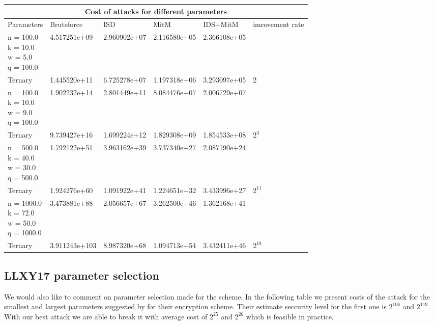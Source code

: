 \documentclass[12pt]{article}
\begin{document}
\begin{tabular}{ |l||p{}|p{}|p{}|p{}|p{2cm}|  }
 \hline
 \multicolumn{6}{|c|}{Cost of attacks for different parameters} \\
 \hline
 Parameters & Bruteforce & ISD & MitM & IDS+MitM & imrovement rate \\
 \hline
 \makecell{n = 100.0 \\ k = 10.0 \\ w = 5.0 \\ q = 100.0} & 4.517251e+09 & 2.960902e+07 & 2.116580e+05 & 2.366108e+05 & \\
 \hline
 Ternary & 1.445520e+11 & 6.725278e+07 & 1.197318e+06 & 3.293097e+05 & 2\\
 \hline
 \makecell{ n = 100.0 \\ k = 10.0 \\ w = 9.0 \\ q = 100.0} & 1.902232e+14 & 2.801449e+11 & 8.084476e+07 & 2.006729e+07 &  \\
 \hline
 Ternary & 9.739427e+16 & 1.699224e+12 & 1.829308e+09 & 1.854533e+08 & $2^{3}$ \\
 \hline
 \makecell{n = 500.0 \\ k = 40.0 \\ w = 30.0 \\ q = 500.0} & 1.792122e+51 &  3.963162e+39 & 3.737340e+27 & 2.087190e+24 &  \\
 \hline
 Ternary & 1.924276e+60 & 1.091922e+41 & 1.224651e+32 & 3.433996e+27 & $2^{11}$\\
 \hline
 \makecell{n = 1000.0 \\ k = 72.0 \\ w = 50.0 \\ q = 1000.0} & 3.473881e+88 & 2.056657e+67 & 3.262500e+46 &  1.362168e+41 &  \\
 \hline
 Ternary & 3.911243e+103 & 8.987320e+68 & 1.094713e+54 & 3.432411e+46 & $2^{18}$ \\
 \hline
\end{tabular}

\subsection{LLXY17 parameter selection}
\label{subsec:param_improvement}

We would also like to comment on parameter selection made for the scheme. In the following table we present costs of the attack for the smallest and largest parameters suggested by \cite{[LLXY17]} for their encryption scheme. Their estimate seccurity level for the first one is $2^{106}$ and $2^{119}$. With our best attack we are able to break it with average cost of $2^{25}$ and $2^{26}$ which is feasible in practice. \\
\end{document}
